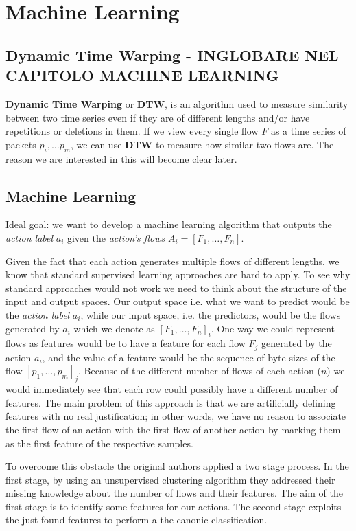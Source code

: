 \section{Machine Learning}
\label{sec:ml}


\subsection{Dynamic Time Warping - INGLOBARE NEL CAPITOLO MACHINE LEARNING}
\textbf{Dynamic Time Warping} or \textbf{DTW}, is an algorithm used to measure similarity between two time series even if they are of different lengths and/or have repetitions or deletions in them. If we view every single flow $F$ as a time series of packets $p_i,\dots p_m$, we can use \textbf{DTW} to measure how similar two flows are. The reason we are interested in this will become clear later.

\subsection{Machine Learning}
Ideal goal: we want to develop a machine learning algorithm that outputs the \textit{action label} $a_i$ given the \textit{action's flows} $A_i = [F_1,\dots, F_n]$.

Given the fact that each action generates multiple flows of different lengths, we know that standard supervised learning approaches are hard to apply. To see why standard approaches would not work we need to think about the structure of the input and output spaces. Our output space i.e. what we want to predict would be the \textit{action label} $a_i$, while our input space, i.e. the predictors, would be the flows generated by $a_i$ which we denote as $[F_1,\dots,F_n]_i $. One way we could represent flows as features would be to have a feature for each flow $F_j$ generated by the action $a_i$, and the value of a feature would be the sequence of byte sizes of the flow $[p_1,\dots, p_m]_j$. Because of the different number of flows of each action ($n$) we would immediately see that each row could possibly have a different number of features. The main problem of this approach is that we are artificially defining features with no real justification; in other words, we have no reason to associate the first flow of an action with the first flow of another action by marking them as the first feature of the respective samples.

To overcome this obstacle the original authors applied a two stage process. In the first stage, by using an unsupervised clustering algorithm they addressed their missing knowledge about the number of flows and their features. The aim of the first stage is to identify some features for our actions. The second stage exploits the just found features to perform a the canonic classification.

